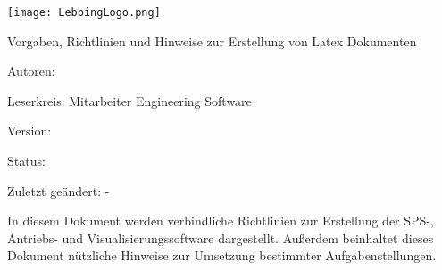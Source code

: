 \begin{titlepage}

    
    \begin{center} 
    \texttt{[image: LebbingLogo.png]}
    \par\vspace{1.5cm}
    {\scshape\Large \company\par}
    \vspace{2cm}
    
    {\Huge\textbf{\titlename}\par}
    \vspace{0.5cm}
    {\Large Vorgaben, Richtlinien und Hinweise zur Erstellung von Latex Dokumenten\par}
    \vspace{1.5cm}
\end{center}
    
        {Autoren:  \authorname\par}
        {Leserkreis:  Mitarbeiter Engineering Software\par}
        {Version:  \version\par}
        {Status:  \state\par}
        {Zuletzt geändert:  \lasteditor-\par}
        { \company\par}
        { \lastchanged\par}        
        \vspace{3cm}
        \noindent In diesem Dokument werden verbindliche Richtlinien zur Erstellung der SPS-, Antriebs- und Visualisierungssoftware dargestellt. Außerdem beinhaltet dieses Dokument nützliche Hinweise zur Umsetzung bestimmter Aufgabenstellungen.
    
    \end{titlepage}